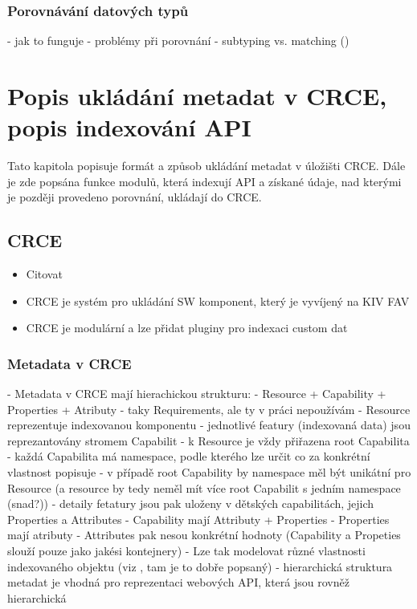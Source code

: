\documentclass[czech,DP]{thesiskiv}
\begin{document}
\subsection{Porovnávání datových typů}

 - jak to funguje
 - problémy při porovnání
 - subtyping vs. matching (\cite{abadi1995subytping})


\chapter{Popis ukládání metadat v CRCE, popis indexování API}

Tato kapitola popisuje formát a způsob ukládání metadat v úložišti CRCE. Dále je zde popsána funkce modulů, která indexují API a získané údaje, nad kterými je později provedeno porovnání, ukládají do CRCE.

\section{CRCE}

\begin{itemize}
	\item Citovat \cite{brada2015repository}
	\item CRCE je systém pro ukládání SW komponent, který je vyvíjený na KIV FAV
	\item CRCE je modulární a lze přidat pluginy pro indexaci custom dat
\end{itemize}

\subsection{Metadata v CRCE}

 - Metadata v CRCE mají hierachickou strukturu:
	 - Resource + Capability + Properties + Atributy
	 - taky Requirements, ale ty v práci nepoužívám
	 - Resource reprezentuje indexovanou komponentu
	 - jednotlivé featury (indexovaná data) jsou reprezantovány stromem Capabilit
	 	- k Resource je vždy přiřazena root Capabilita
	 	- každá Capabilita má namespace, podle kterého lze určit co za konkrétní vlastnost popisuje
	 	- v případě root Capability by namespace měl být unikátní pro Resource (a resource by tedy neměl mít více root Capabilit s jedním namespace (snad?))
	 	- detaily fetatury jsou pak uloženy v dětských capabilitách, jejich Properties a Attributes
 - Capability mají Attributy + Properties
 - Properties mají atributy
 - Attributes pak nesou konkrétní hodnoty (Capability a Propeties slouží pouze jako jakési kontejnery)
 - Lze tak modelovat různé vlastnosti indexovaného objektu (viz \cite{brada2015repository}, tam je to dobře popsaný)
 - hierarchická struktura metadat je vhodná pro reprezentaci webových API, která jsou rovněž hierarchická
 
\end{document}
